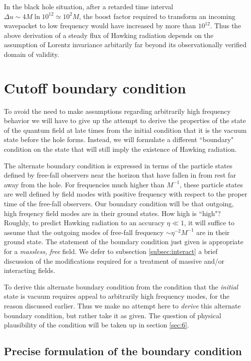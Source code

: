 \documentclass[12pt]{article}
\begin{document}
In the black hole situation, after a retarded time interval
$\Delta u\sim 4M \ln 10^{12}\simeq 10^2 M$,
the boost factor required to transform
an incoming wavepacket to low frequency would have increased
by more than $10^{12}$. Thus the above derivation of a
steady flux of Hawking radiation depends on the assumption
of Lorentz invariance arbitarily far beyond its observationally
verified domain of validity.
\section{Cutoff boundary condition}
\label{sec:4}

To avoid the need to make assumptions regarding arbitrarily
high frequency behavior we will have to give up the attempt
to derive the properties of the state of the quantum field
at late times from the initial condition that it is the
vacuum state before the hole forms. Instead, we will formulate
a different ``boundary" condition on the state that will
still imply the existence of Hawking radiation.

The alternate boundary condition is expressed in terms of
the particle states defined by free-fall observers near the
horizon that have fallen in from rest far away from the
hole. For frequencies much higher than $M^{-1}$, these particle
states are well defined by field modes with positive
frequency with respect to the proper time of the free-fall
observers. Our boundary condition will be that outgoing,
high freqency field modes are in their ground states. How
high is ``high"? Roughly, to predict Hawking radiation
to an accuracy $\eta\ll 1$, it will suffice to assume that the
outgoing modes of free-fall frequency
$\sim \eta^{-2}M^{-1}$ are in their ground state.
The statement of the boundary condition just given is
appropriate for a {\it massless, free} field. We defer to
subsection
\ref{subsec:interact} a brief discussion of the modifications
required for a treatment of massive and/or interacting fields.

To derive this alternate boundary condition from the condition
that the {\it initial} state is vacuum requires appeal to
arbitrarily high frequency modes, for the reason discussed
earlier. Thus we make no attempt here to {\it derive} this
alternate boundary condition, but rather take it as given.
The question of physical plausibility of the condition will
be taken up in section \ref{sec:6}.

\subsection{Precise formulation of the boundary condition}
\label{subsec:precise}
\end{document}

